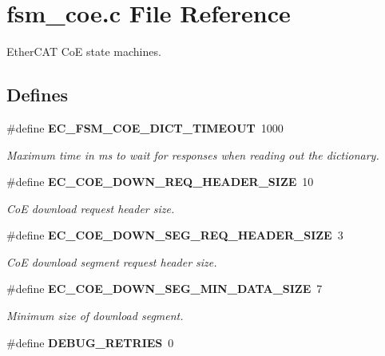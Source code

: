 \section{fsm\-\_\-coe.\-c \-File \-Reference}
\label{fsm__coe_8c}


\-Ether\-C\-A\-T \-Co\-E state machines.  


\subsection*{\-Defines}
\begin{DoxyCompactItemize}
\item 
\#define {\bf \-E\-C\-\_\-\-F\-S\-M\-\_\-\-C\-O\-E\-\_\-\-D\-I\-C\-T\-\_\-\-T\-I\-M\-E\-O\-U\-T}~1000\label{fsm__coe_8c_a9459f4f7c6dc0d811bf9c7c227209afd}

\begin{DoxyCompactList}\small\item\em \-Maximum time in ms to wait for responses when reading out the dictionary. \end{DoxyCompactList}\item 
\#define {\bf \-E\-C\-\_\-\-C\-O\-E\-\_\-\-D\-O\-W\-N\-\_\-\-R\-E\-Q\-\_\-\-H\-E\-A\-D\-E\-R\-\_\-\-S\-I\-Z\-E}~10\label{fsm__coe_8c_a184740a02f1c15e830427d85b5f496ee}

\begin{DoxyCompactList}\small\item\em \-Co\-E download request header size. \end{DoxyCompactList}\item 
\#define {\bf \-E\-C\-\_\-\-C\-O\-E\-\_\-\-D\-O\-W\-N\-\_\-\-S\-E\-G\-\_\-\-R\-E\-Q\-\_\-\-H\-E\-A\-D\-E\-R\-\_\-\-S\-I\-Z\-E}~3\label{fsm__coe_8c_a3ab909f26c5840a5a39c27705511d104}

\begin{DoxyCompactList}\small\item\em \-Co\-E download segment request header size. \end{DoxyCompactList}\item 
\#define {\bf \-E\-C\-\_\-\-C\-O\-E\-\_\-\-D\-O\-W\-N\-\_\-\-S\-E\-G\-\_\-\-M\-I\-N\-\_\-\-D\-A\-T\-A\-\_\-\-S\-I\-Z\-E}~7\label{fsm__coe_8c_a1fa158e9b4d200fb14e9e32b414e463a}

\begin{DoxyCompactList}\small\item\em \-Minimum size of download segment. \end{DoxyCompactList}\item 
\#define {\bf \-D\-E\-B\-U\-G\-\_\-\-R\-E\-T\-R\-I\-E\-S}~0\label{fsm__coe_8c_ac8c424f6a0ede98cabd81436c9d2bd65}


\end{DoxyCompactItemize}
